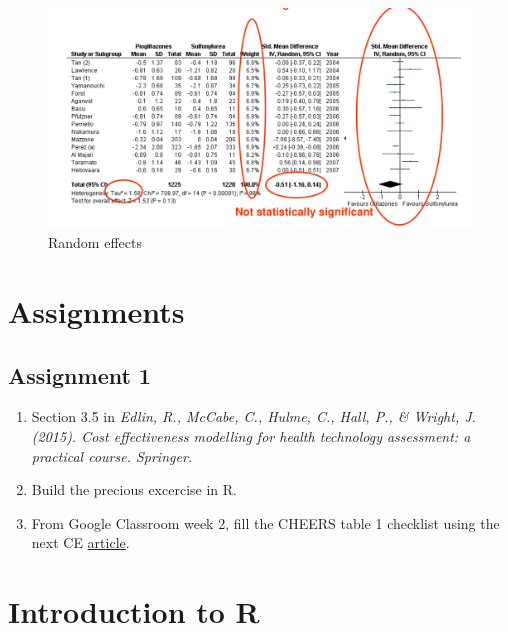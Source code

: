 \documentclass[
]{book}
\providecommand{\tightlist}{%
  \setlength{\itemsep}{0pt}\setlength{\parskip}{0pt}}
\begin{document}
\begin{figure}

{\centering \includegraphics[width=18.28in]{images/random_example} 

}

\caption{Random effects}\label{fig:unnamed-chunk-6}
\end{figure}

\hypertarget{assignments}{%
\chapter*{Assignments}\label{assignments}}

\hypertarget{assignment-1}{%
\section*{Assignment 1}\label{assignment-1}}

\begin{enumerate}
\def\labelenumi{\arabic{enumi}.}
\tightlist
\item
  Section 3.5 in \emph{Edlin, R., McCabe, C., Hulme, C., Hall, P., \& Wright, J. (2015). Cost effectiveness modelling for health technology assessment: a practical course. Springer.}
\item
  Build the precious excercise in R.
\item
  From Google Classroom week 2, fill the CHEERS table 1 checklist using the next CE \href{https://jamanetwork.com/journals/jamanetworkopen/fullarticle/2775235}{article}.
\end{enumerate}

\hypertarget{introduction-to-r}{%
\chapter*{Introduction to R}\label{introduction-to-r}}
\end{document}
